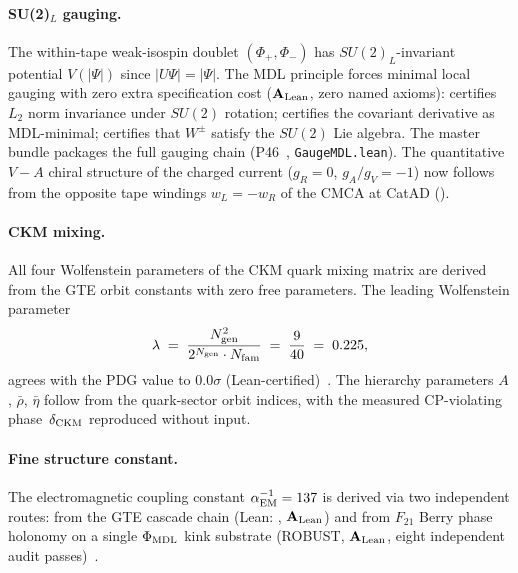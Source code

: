 \paragraph{SU(2)$_L$ gauging.}
The within-tape weak-isospin doublet $(\Phi_+,\Phi_-)$ has $SU(2)_L$-invariant
potential $V(|\Psi|)$ since $|U\Psi|=|\Psi|$.  The MDL principle forces minimal
local gauging with zero extra specification cost ($\textbf{A}_{\rm Lean}$, zero named axioms):
 certifies $L_2$ norm invariance under
$SU(2)$ rotation;  certifies the
covariant derivative as MDL-minimal; 
certifies that $W^\pm$ satisfy the $SU(2)$ Lie algebra.  The master bundle
 packages the full gauging chain
(P46~\cite{SpivackGTEPolynomialUFT}, \texttt{GaugeMDL.lean}).
The quantitative $V{-}A$ chiral structure of the charged current
($g_R = 0$, $g_A/g_V = -1$) now follows from the opposite tape windings
$w_L = -w_R$ of the CMCA at CatAD ().

\paragraph{CKM mixing.}
All four Wolfenstein parameters of the CKM quark mixing matrix are derived from the
GTE orbit constants with zero free parameters.  The leading Wolfenstein parameter
\[
  \lambda \;=\; \frac{N_{\rm gen}^2}{2^{N_{\rm gen}} \cdot N_{\rm fam}} \;=\;
  \frac{9}{40} \;=\; 0.225,
\]
agrees with the PDG value to $0.0\sigma$ (Lean-certified)~\cite{SpivackCKM}.
The hierarchy parameters $A$, $\bar\rho$, $\bar\eta$ follow from the quark-sector
orbit indices, with the measured CP-violating phase~$\delta_{\rm CKM}$ reproduced
without input.

\paragraph{Fine structure constant.}
The electromagnetic coupling constant
$\alpha_{\rm EM}^{-1} = 137$ is derived via two independent routes: from the GTE
cascade chain (Lean: , $\mathbf{A}_{\rm Lean}$) and from
$F_{21}$ Berry phase holonomy on a single $\Phi_{\rm MDL}$ kink substrate (ROBUST,
$\mathbf{A}_{\rm Lean}$, eight independent audit passes)~\cite{SpivackGTEUnification}.

